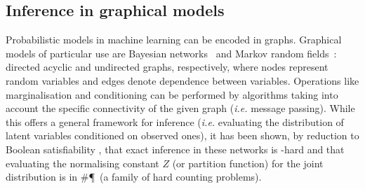 \documentclass[a4paper, 11pt]{article}
\begin{document}
\subsection*{Inference in graphical models}


Probabilistic models in machine learning can be encoded in graphs. Graphical models of particular use are Bayesian networks~\cite{pearl1985bayesian} and Markov random fields~\cite{kindermann1980markov}: directed acyclic and undirected graphs, respectively, where nodes represent random variables and edges denote dependence between variables. Operations like marginalisation and conditioning can be performed by algorithms taking into account the specific connectivity of the given graph (\textit{i.e.} message passing). While this offers a general framework for inference (\textit{i.e.} evaluating the distribution of latent variables conditioned on observed ones), it has been shown, by reduction to Boolean satisfiability \cite{cooper1990computational}, that exact inference in these networks is \NP-hard and that evaluating the normalising constant \(Z\) (or partition function) for the joint distribution is in \#\P~(a family of hard counting problems).\\

\end{document}
